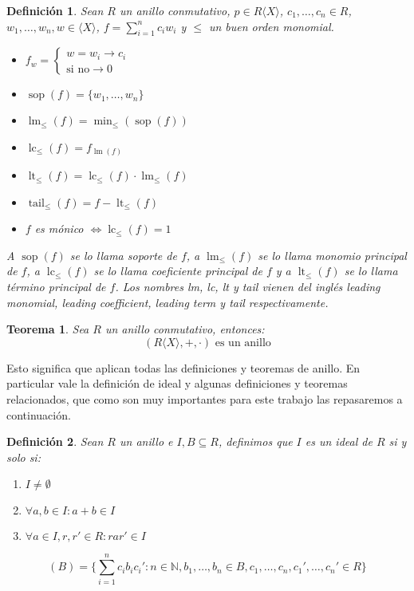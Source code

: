 \documentclass{amsbook} %
\theoremstyle{customstyle}
\newtheorem{definition}{Definición}[chapter]
\newtheorem{theorem}{Teorema}[chapter]
\theoremstyle{factstyle}
\DeclareMathOperator{\sop}{sop}
\DeclareMathOperator{\lm}{lm}
\DeclareMathOperator{\lc}{lc}
\DeclareMathOperator{\lt}{lt}
\DeclareMathOperator{\tail}{tail}
\begin{document}
\begin{definition}
Sean $R$ un anillo conmutativo, $p ∈ R⟨X⟩$, $c_1, …, c_n ∈ R$, $w_1, …, w_n, w ∈ ⟨X⟩$, $f = ∑_{i = 1}^n c_i w_i$ y $≤$ un buen orden monomial.
\begin{itemize}
\item $f_w = \left\{\begin{array}{ll} w = w_i → c_i \\ \text{si no} → 0  \end{array} \right.$
\item $\sop(f) = \{w_1, …, w_n\}$
\item $\lm_≤(f) = \min_≤(\sop(f))$
\item $\lc_≤(f) = f_{\lm(f)}$
\item $\lt_≤(f) = \lc_≤(f) · \lm_≤(f)$
\item $\tail_≤(f) = f - \lt_≤(f)$
\item $f$ es mónico $⇔ \lc_≤(f) = 1$
\end{itemize}

A $\sop(f)$ se lo llama soporte de $f$, a $\lm_≤(f)$ se lo llama monomio principal de $f$, a $\lc_≤(f)$ se lo llama coeficiente principal de $f$ y a $\lt_≤(f)$ se lo llama término principal de $f$. Los nombres lm, lc, lt y tail vienen del inglés leading monomial, leading coefficient, leading term y tail respectivamente.

\end{definition}

\begin{theorem}
Sea $R$ un anillo conmutativo, entonces:
\[ (R⟨X⟩, +, ·)\text{ es un anillo} \]
\end{theorem}

Esto significa que aplican todas las definiciones y teoremas de anillo.
En particular vale la definición de ideal y algunas definiciones y teoremas relacionados, que como son muy importantes para este trabajo las repasaremos a continuación.

\begin{definition}\label{def:ideal}
Sean $R$ un anillo e $I, B ⊆ R$, definimos que $I$ es un ideal de $R$ si y solo si:
\begin{enumerate}
\item $I ≠ ∅$

\item $∀a, b ∈ I : a + b ∈ I$

\item $∀a ∈ I, r, r' ∈ R : r a r' ∈ I$
\end{enumerate}

\[ (B) = \{∑_{i = 1}^n c_i b_i c_i' : n ∈ ℕ, b_1, …, b_n ∈ B, c_1, …, c_n, c_1', …, c_n' ∈ R\} \]
\end{definition}
\end{document}
